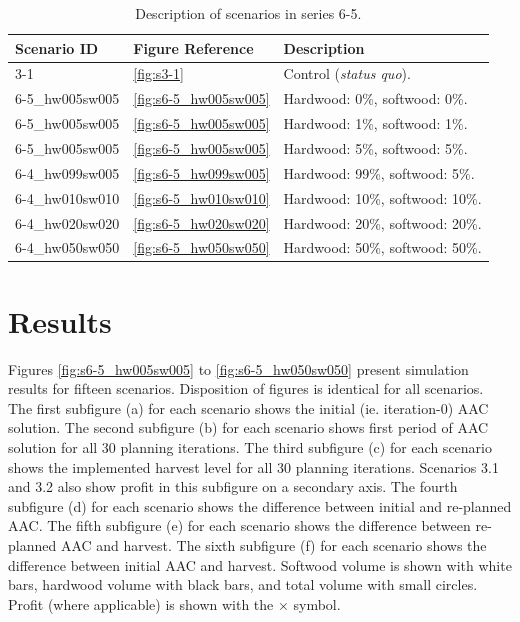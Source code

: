 \begin{table}
  \centering
  \begin{tabular}{lll}
    \hline
    Scenario ID & Figure Reference & Description \\
    \hline
    3-1 & \ref{fig:s3-1} & Control (\emph{status quo}). \\
    6-5\_hw005sw005 & \ref{fig:s6-5_hw005sw005} & Hardwood: 0\%, softwood: 0\%. \\
    6-5\_hw005sw005 & \ref{fig:s6-5_hw005sw005} & Hardwood: 1\%, softwood: 1\%. \\
    6-5\_hw005sw005 & \ref{fig:s6-5_hw005sw005} & Hardwood: 5\%, softwood: 5\%. \\
    6-4\_hw099sw005 & \ref{fig:s6-5_hw099sw005} & Hardwood: 99\%, softwood: 5\%. \\
    6-4\_hw010sw010 & \ref{fig:s6-5_hw010sw010} & Hardwood: 10\%, softwood: 10\%. \\
    6-4\_hw020sw020 & \ref{fig:s6-5_hw020sw020} & Hardwood: 20\%, softwood: 20\%. \\
    6-4\_hw050sw050 & \ref{fig:s6-5_hw050sw050} & Hardwood: 50\%, softwood: 50\%. \\

    \hline
  \end{tabular}
  \caption{Description of scenarios in series 6-5.}
  \label{tab:scenario_list}
\end{table}

\section{Results}

Figures \ref{fig:s6-5_hw005sw005} to \ref{fig:s6-5_hw050sw050} present
simulation results for fifteen scenarios. %
Disposition of figures is identical for all scenarios. The
first subfigure (a) for each scenario shows the initial
(ie. iteration-0) AAC solution. The second subfigure (b) for each
scenario shows first period of AAC solution for all 30 planning
iterations. The third subfigure (c) for each scenario shows the
implemented harvest level for all 30 planning iterations. Scenarios
3.1 and 3.2 also show profit in this subfigure on a secondary
axis. The fourth subfigure (d) for each scenario shows the difference
between initial and re-planned AAC. The fifth subfigure (e) for each
scenario shows the difference between re-planned AAC and harvest.  The
sixth subfigure (f) for each scenario shows the difference between
initial AAC and harvest. Softwood volume is shown with white bars,
hardwood volume with black bars, and total volume with small
circles. Profit (where applicable) is shown with the $\times$
symbol. 


